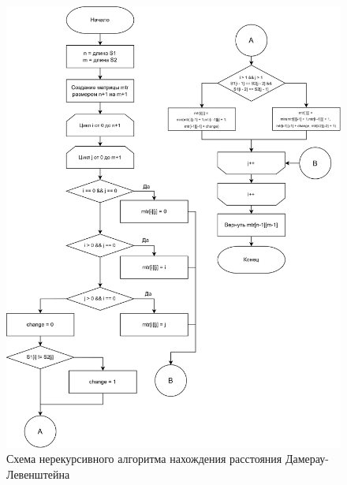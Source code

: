 \begin{figure}[h]
	\centering
	\includegraphics[height=0.8\textheight]{img/dliter.png}
	\caption{Схема нерекурсивного алгоритма нахождения расстояния Дамерау-Левенштейна}
	\label{fig:DLiter}
\end{figure}

\clearpage

